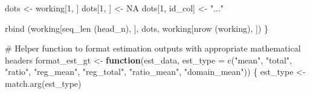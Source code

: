 \documentclass[
  letterpaper,
  DIV=11,
  numbers=noendperiod]{scrreprt}
\newenvironment{Shaded}{\begin{snugshade}}{\end{snugshade}}
\newcommand{\AttributeTok}[1]{\textcolor[rgb]{0.40,0.45,0.13}{#1}}
\newcommand{\CommentTok}[1]{\textcolor[rgb]{0.37,0.37,0.37}{#1}}
\newcommand{\ConstantTok}[1]{\textcolor[rgb]{0.56,0.35,0.01}{#1}}
\newcommand{\ControlFlowTok}[1]{\textcolor[rgb]{0.00,0.23,0.31}{\textbf{#1}}}
\newcommand{\DecValTok}[1]{\textcolor[rgb]{0.68,0.00,0.00}{#1}}
\newcommand{\FunctionTok}[1]{\textcolor[rgb]{0.28,0.35,0.67}{#1}}
\newcommand{\NormalTok}[1]{\textcolor[rgb]{0.00,0.23,0.31}{#1}}
\newcommand{\OtherTok}[1]{\textcolor[rgb]{0.00,0.23,0.31}{#1}}
\newcommand{\StringTok}[1]{\textcolor[rgb]{0.13,0.47,0.30}{#1}}
\renewcommand{\[}{\begin{equation}}
\renewcommand{\]}{\end{equation}}
\begin{document}
\begin{Shaded}
\begin{Highlighting}[]
\NormalTok{    dots }\OtherTok{\textless{}{-}}\NormalTok{ working[}\DecValTok{1}\NormalTok{, ]}
\NormalTok{    dots[}\DecValTok{1}\NormalTok{, ] }\OtherTok{\textless{}{-}} \ConstantTok{NA}
\NormalTok{    dots[}\DecValTok{1}\NormalTok{, id\_col] }\OtherTok{\textless{}{-}} \StringTok{"..."}

    \FunctionTok{rbind}\NormalTok{ (working[}\FunctionTok{seq\_len}\NormalTok{ (head\_n), ], dots, working[}\FunctionTok{nrow}\NormalTok{ (working), ])}
\NormalTok{\}}

\CommentTok{\# Helper function to format estimation outputs with appropriate mathematical headers}
\NormalTok{format\_est\_gt }\OtherTok{\textless{}{-}} \ControlFlowTok{function}\NormalTok{(est\_data, }\AttributeTok{est\_type =} \FunctionTok{c}\NormalTok{(}\StringTok{"mean"}\NormalTok{, }\StringTok{"total"}\NormalTok{, }\StringTok{"ratio"}\NormalTok{, }\StringTok{"reg\_mean"}\NormalTok{, }\StringTok{"reg\_total"}\NormalTok{, }\StringTok{"ratio\_mean"}\NormalTok{, }\StringTok{"domain\_mean"}\NormalTok{)) \{}
\NormalTok{  est\_type }\OtherTok{\textless{}{-}} \FunctionTok{match.arg}\NormalTok{(est\_type)}


\end{Highlighting}
\end{Shaded}
\end{document}
